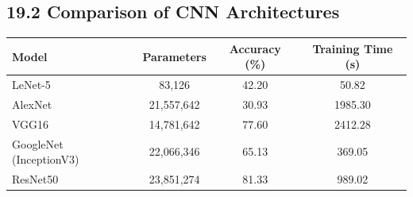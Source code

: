 \documentclass[11pt]{article}
\begin{document}
\vspace{5mm}

\subsection*{19.2 Comparison of CNN Architectures}

\begin{center}
\begin{tabular}{|l|c|c|c|}
\hline
\textbf{Model} & \textbf{Parameters} & \textbf{Accuracy (\%)} & \textbf{Training Time (s)} \\
\hline
LeNet-5 & 83,126 & 42.20 & 50.82 \\
\hline
AlexNet & 21,557,642 & 30.93 & 1985.30 \\
\hline
VGG16 & 14,781,642 & 77.60 & 2412.28 \\
\hline
GoogleNet (InceptionV3) & 22,066,346 & 65.13 & 369.05 \\
\hline
ResNet50 & 23,851,274 & 81.33 & 989.02 \\
\hline
\end{tabular}
\end{center}











\end{document}
